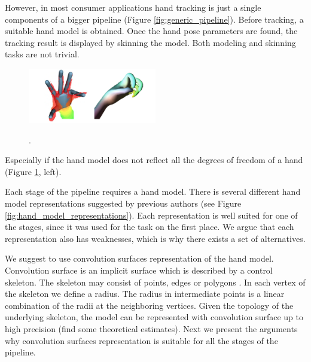 
However, in most consumer applications hand tracking is just a single components of a bigger pipeline (Figure \ref{fig:generic_pipeline}). Before tracking, a suitable hand model is obtained. Once the hand pose parameters are found, the tracking result is displayed by skinning the model. Both modeling and skinning tasks are not trivial.

\begin{figure}[h!] 
\centering
\hspace{-2em}
\includegraphics[width=0.5\textwidth]{fig/coarse_hand_model_and_lbs}
\caption{}.
\label{fig:coarse_hand_model_and_lbs}
\end{figure}

Especially if the hand model does not reflect all the degrees of freedom of a hand (Figure \ref{fig:coarse_hand_model_and_lbs}, left).

Each stage of the pipeline requires a hand model. There is several different hand model representations suggested by previous authors (see Figure \ref{fig:hand_model_representations}). Each representation is well suited for one of the stages, since it was used for the task on the first place. We argue that each representation also has weaknesses, which is why there exists a set of alternatives.

We suggest to use convolution surfaces representation of the hand model. Convolution surface is an implicit surface which is described by a control skeleton. The skeleton may consist of points, edges or polygons \cite{bloomenthal1991convolution}. In each vertex of the skeleton we define a radius. The radius in intermediate points is a linear combination of the radii at the neighboring vertices. Given the topology of the underlying skeleton, the model can be represented with convolution surface up to high precision \textcolor{mygray}{(find some theoretical estimates).} Next we present the arguments why convolution surfaces representation is suitable for all the stages of the pipeline.